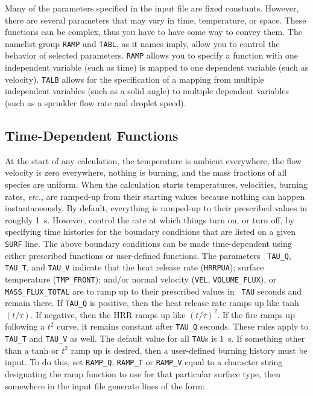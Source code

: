 \documentclass[11pt]{book}
\newcommand{\ct}{\tt\small}
\begin{document}
Many of the parameters specified in the input file are fixed constants. However, there are several parameters that may vary in
time, temperature, or space. These functions can be complex, thus you have to have some way to convey them. The namelist group
{\ct RAMP} and {\ct TABL}, as it names imply, allow you to control the behavior of selected parameters.  {\ct RAMP} allows you
to specify a function with one independent variable (such as time) is mapped to one dependent variable (such as velocity).
{\ct TALB} allows for the specification of a mapping from multiple independent variables (such as a solid angle) to multiple
dependent variables (such as a sprinkler flow rate and droplet speed).

\subsection{Time-Dependent Functions}

At the start of any calculation, the temperature is ambient
everywhere, the flow velocity is zero everywhere, nothing is burning,
and the mass fractions of all species are uniform.  When the
calculation starts temperatures, velocities, burning rates, {\em
etc.}, are ramped-up from their starting values because nothing can
happen instantaneously. By default, everything is ramped-up to their
prescribed values in roughly 1~s. However, control the rate at which
things turn on, or turn off, by specifying time histories for the
boundary conditions that are listed on a given {\ct SURF} line.  The
above boundary conditions can be made time-dependent using either
prescribed functions or user-defined functions.  The parameters {\ct
TAU\_Q}, {\ct TAU\_T}, and {\ct TAU\_V} indicate that the heat release
rate ({\ct HRRPUA}); surface temperature ({\ct TMP\_FRONT}); and/or
normal velocity ({\ct VEL}, {\ct VOLUME\_FLUX}), or {\ct
MASS\_FLUX\_TOTAL} are to ramp up to their prescribed values in {\ct
TAU} seconds and remain there.  If {\ct TAU\_Q} is positive, then the
heat release rate ramps up like tanh$(t/\tau)$. If negative, then the
HRR ramps up like $(t/\tau)^2$. If the fire ramps up following a $t^2$
curve, it remains constant after {\ct TAU\_Q} seconds.  These rules
apply to {\ct TAU\_T} and {\ct TAU\_V} as well.  The default value for
all {\ct TAU}s is 1~s.  If something other than a tanh or $t^2$ ramp
up is desired, then a user-defined burning history must be input. To
do this, set {\ct RAMP\_Q}, {\ct RAMP\_T} or {\ct RAMP\_V} equal to a
character string designating the ramp function to use for that
particular surface type, then somewhere in the input file generate
lines of the form:
\end{document}

